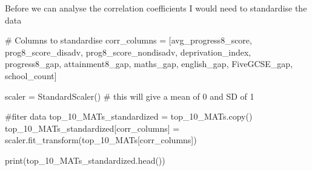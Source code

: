 \documentclass[
  letterpaper,
  DIV=11,
  numbers=noendperiod]{scrartcl}
\newenvironment{Shaded}{\begin{snugshade}}{\end{snugshade}}
\newcommand{\BuiltInTok}[1]{\textcolor[rgb]{0.00,0.23,0.31}{#1}}
\newcommand{\CommentTok}[1]{\textcolor[rgb]{0.37,0.37,0.37}{#1}}
\newcommand{\NormalTok}[1]{\textcolor[rgb]{0.00,0.23,0.31}{#1}}
\newcommand{\OperatorTok}[1]{\textcolor[rgb]{0.37,0.37,0.37}{#1}}
\newcommand{\StringTok}[1]{\textcolor[rgb]{0.13,0.47,0.30}{#1}}
\begin{document}
Before we can analyse the correlation coefficients I would need to
standardise the data

\begin{Shaded}
\begin{Highlighting}[]


\CommentTok{\# Columns to standardise}
\NormalTok{corr\_columns }\OperatorTok{=}\NormalTok{ [}\StringTok{\textquotesingle{}avg\_progress8\_score\textquotesingle{}}\NormalTok{, }\StringTok{\textquotesingle{}prog8\_score\_disadv\textquotesingle{}}\NormalTok{, }
                \StringTok{\textquotesingle{}prog8\_score\_nondisadv\textquotesingle{}}\NormalTok{, }\StringTok{\textquotesingle{}deprivation\_index\textquotesingle{}}\NormalTok{, }\StringTok{\textquotesingle{}progress8\_gap\textquotesingle{}}\NormalTok{, }
                \StringTok{\textquotesingle{}attainment8\_gap\textquotesingle{}}\NormalTok{, }\StringTok{\textquotesingle{}maths\_gap\textquotesingle{}}\NormalTok{, }\StringTok{\textquotesingle{}english\_gap\textquotesingle{}}\NormalTok{, }\StringTok{\textquotesingle{}FiveGCSE\_gap\textquotesingle{}}\NormalTok{,}
                \StringTok{\textquotesingle{}school\_count\textquotesingle{}}\NormalTok{]}

\NormalTok{scaler }\OperatorTok{=}\NormalTok{ StandardScaler() }\CommentTok{\# this will give a mean of 0 and SD of 1}

\CommentTok{\#fiter data}
\NormalTok{top\_10\_MATs\_standardized }\OperatorTok{=}\NormalTok{ top\_10\_MATs.copy()}
\NormalTok{top\_10\_MATs\_standardized[corr\_columns] }\OperatorTok{=}\NormalTok{ scaler.fit\_transform(top\_10\_MATs[corr\_columns])}


\BuiltInTok{print}\NormalTok{(top\_10\_MATs\_standardized.head())}
\end{Highlighting}
\end{Shaded}
\end{document}
